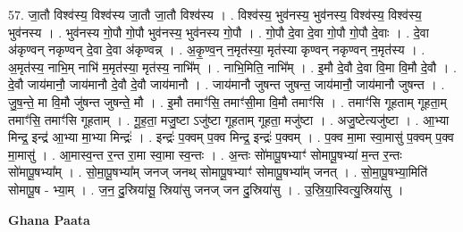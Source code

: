 \documentclass[17pt]{extarticle}
\begin{document}
57. जा॒तौ विश्व॑स्य॒ विश्व॑स्य जा॒तौ जा॒तौ विश्व॑स्य । . विश्व॑स्य॒ भुव॑नस्य॒ भुव॑नस्य॒ विश्व॑स्य॒ विश्व॑स्य॒ भुव॑नस्य । . भुव॑नस्य गो॒पौ गो॒पौ भुव॑नस्य॒ भुव॑नस्य गो॒पौ । . गो॒पौ दे॒वा दे॒वा गो॒पौ गो॒पौ दे॒वाः । . दे॒वा अ॑कृण्वन् नकृण्वन् दे॒वा दे॒वा अ॑कृण्वन्न् । . अ॒कृ॒ण्व॒न् न॒मृत॑स्या॒ मृत॑स्या कृण्वन् नकृण्वन् न॒मृत॑स्य । . अ॒मृत॑स्य॒ नाभि॒म् नाभि॑ म॒मृत॑स्या॒ मृत॑स्य॒ नाभि᳚म् । . नाभि॒मिति॒ नाभि᳚म् । . इ॒मौ दे॒वौ दे॒वा वि॒मा वि॒मौ दे॒वौ । . दे॒वौ जाय॑मानौ॒ जाय॑मानौ दे॒वौ दे॒वौ जाय॑मानौ । . जाय॑मानौ जुषन्त जुषन्त॒ जाय॑मानौ॒ जाय॑मानौ जुषन्त । . जु॒ष॒न्ते॒ मा वि॒मौ जु॑षन्त जुषन्ते॒ मौ । . इ॒मौ तमाꣳ॑सि॒ तमाꣳ॑सी॒मा वि॒मौ तमाꣳ॑सि । . तमाꣳ॑सि गूहताम् गूहता॒म् तमाꣳ॑सि॒ तमाꣳ॑सि गूहताम् । . गू॒ह॒ता॒ मजु॒ष्टा ऽजु॑ष्टा गूहताम् गूहता॒ मजु॑ष्टा । . अजु॒ष्टेत्यजु॑ष्टा । . आ॒भ्या मिन्द्र॒ इन्द्र॑ आ॒भ्या मा॒भ्या मिन्द्रः॑ । . इन्द्रः॑ प॒क्वम् प॒क्व मिन्द्र॒ इन्द्रः॑ प॒क्वम् । . प॒क्व मा॒मा स्वा॒मासु॑ प॒क्वम् प॒क्व मा॒मासु॑ । . आ॒मास्व॒न्त र॒न्त रा॒मा स्वा॒मा स्व॒न्तः । . अ॒न्तः सो॑मापू॒षभ्याꣳ॑ सोमापू॒षभ्या॑ म॒न्त र॒न्तः सो॑मापू॒षभ्या᳚म् । . सो॒मा॒पू॒षभ्या᳚म् जनज् जनथ् सोमापू॒षभ्याꣳ॑ सोमापू॒षभ्या᳚म् जनत् । . सो॒मा॒पू॒षभ्या॒मिति॑ सोमापू॒ष - भ्या॒म् । . ज॒न॒ दु॒स्रिया॑सू॒ स्रिया॑सु जनज् जन दु॒स्रिया॑सु । . उ॒स्रि॒या॒स्वित्यु॒स्रिया॑सु । \newline

\textbf{Ghana Paata } \newline
\end{document}
